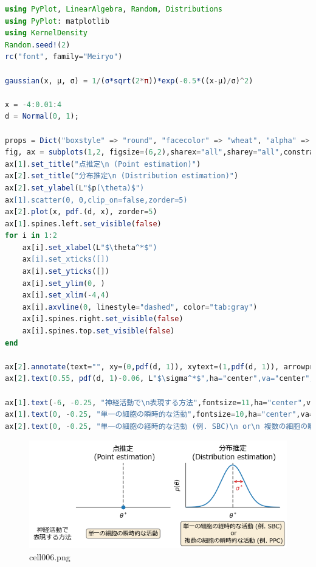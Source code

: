 \begin{lstlisting}[language=julia]
using PyPlot, LinearAlgebra, Random, Distributions
using PyPlot: matplotlib
using KernelDensity
Random.seed!(2)
rc("font", family="Meiryo")

gaussian(x, μ, σ) = 1/(σ*sqrt(2*π))*exp(-0.5*((x-μ)/σ)^2)

x = -4:0.01:4
d = Normal(0, 1); 

props = Dict("boxstyle" => "round", "facecolor" => "wheat", "alpha" => 0.5)
fig, ax = subplots(1,2, figsize=(6,2),sharex="all",sharey="all",constrained_layout=true)
ax[1].set_title("点推定\n (Point estimation)")
ax[2].set_title("分布推定\n (Distribution estimation)")
ax[2].set_ylabel(L"$p(\theta)$")
ax[1].scatter(0, 0,clip_on=false,zorder=5)
ax[2].plot(x, pdf.(d, x), zorder=5)
ax[1].spines.left.set_visible(false)
for i in 1:2
    ax[i].set_xlabel(L"$\theta^*$")
    ax[i].set_xticks([])
    ax[i].set_yticks([])
    ax[i].set_ylim(0, )
    ax[i].set_xlim(-4,4)
    ax[i].axvline(0, linestyle="dashed", color="tab:gray")
    ax[i].spines.right.set_visible(false)
    ax[i].spines.top.set_visible(false)
end

ax[2].annotate(text="", xy=(0,pdf(d, 1)), xytext=(1,pdf(d, 1)), arrowprops=Dict("arrowstyle" => "<->", "color" => "tab:red"))
ax[2].text(0.55, pdf(d, 1)-0.06, L"$\sigma^*$",ha="center",va="center",color="tab:red");

ax[1].text(-6, -0.25, "神経活動で\n表現する方法",fontsize=11,ha="center",va="center");
ax[1].text(0, -0.25, "単一の細胞の瞬時的な活動",fontsize=10,ha="center",va="center", bbox=props);
ax[2].text(0, -0.25, "単一の細胞の経時的な活動 (例. SBC)\n or\n 複数の細胞の瞬時的な活動 (例. PPC)",fontsize=10,ha="center",va="center", bbox=props);
\end{lstlisting}
\begin{figure}[ht]
	\centering
	\includegraphics[scale=0.8, max width=\linewidth]{./fig/bayesian-brain/neural-uncertainty-representation/cell006.png}
	\caption{cell006.png}
	\label{cell006.png}
\end{figure}
